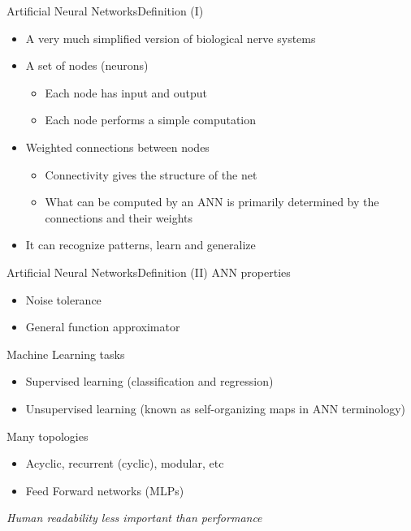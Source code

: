 \documentclass[10pt,compress]{beamer} %
\begin{document}
\begin{frame}{Artificial Neural Networks}{Definition (I)}
	\begin{itemize}
	\item A very much simplified version of biological nerve systems
	\item A set of nodes (neurons) 
		\begin{itemize}
		\item Each node has input and output
		\item Each node performs a simple computation 
		\end{itemize}
	\item Weighted connections between nodes
		\begin{itemize}
		\item Connectivity gives the structure of the net
		\item What can be computed by an ANN is primarily determined by the connections and their weights
		\end{itemize}
	\item It can \alert{recognize patterns}, \alert{learn} and \alert{generalize}
	\end{itemize}
\end{frame}

\begin{frame}{Artificial Neural Networks}{Definition (II)}
ANN properties
	\begin{itemize}
	\item Noise tolerance
	\item General function approximator
	\end{itemize}
Machine Learning tasks
	\begin{itemize}
	\item Supervised learning (classification and regression)
	\item Unsupervised learning (known as \alert{self-organizing maps} in ANN terminology)
	\end{itemize}
Many topologies
	\begin{itemize}
		\item Acyclic, recurrent (cyclic), modular, etc
		\item Feed Forward networks (MLPs)
	\end{itemize}
\centering \textit{Human readability less important than performance}
\end{frame}

\end{document}

